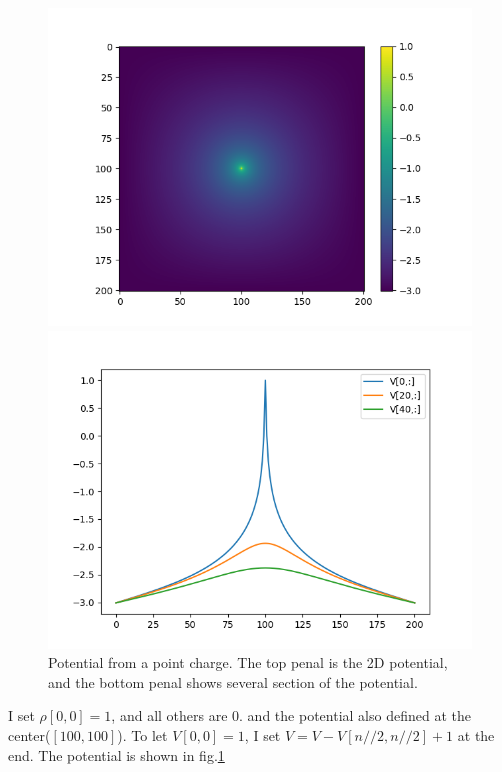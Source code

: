 \documentclass[showpacs, oneside, onecolumn, prl, amsmath, amssymb, nofootinbib, superscriptaddress, notitlepage]{revtex4-1}
\newcommand\bfig{\begin{figure}}
\newcommand\efig{\end{figure}}
\begin{document}
\bfig
	\centering
	\subfigure
	{\begin{minipage}[b]{1\textwidth}
	\includegraphics[scale=0.9]{7-2-1.png}
	\end{minipage}}
	\subfigure
	{\begin{minipage}[b]{1\textwidth}
	\includegraphics[scale=0.9]{7-2-1-2.png}
	\end{minipage}}
	\caption{Potential from a point charge. The top penal is the 2D potential, and the bottom penal shows several section of the potential.}
	\label{7-2-1}
\efig


I set $\rho[0,0]=1$, and all others are 0. and the potential also defined at the center($[100,100]$). To let $V[0,0]=1$, I set $V=V-V[n//2,n//2]+1$ at the end. The potential is shown in fig.\ref{7-2-1}
\end{document}
